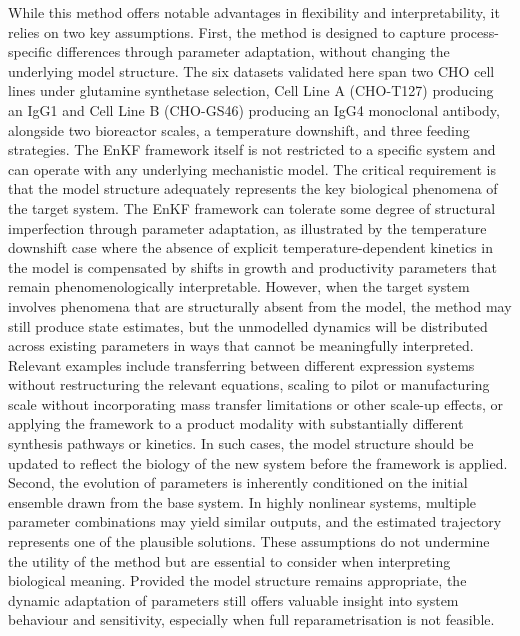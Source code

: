 While this method offers notable advantages in flexibility and interpretability, it relies on two key assumptions. First, the method is designed to capture process-specific differences through parameter adaptation, without changing the underlying model structure. {\color{blue} The six datasets validated here span two CHO cell lines under glutamine synthetase selection, Cell Line A (CHO-T127) producing an IgG1 and Cell Line B (CHO-GS46) producing an IgG4 monoclonal antibody, alongside two bioreactor scales, a temperature downshift, and three feeding strategies. The EnKF framework itself is not restricted to a specific system and can operate with any underlying mechanistic model. The critical requirement is that the model structure adequately represents the key biological phenomena of the target system. The EnKF framework can tolerate some degree of structural imperfection through parameter adaptation, as illustrated by the temperature downshift case where the absence of explicit temperature-dependent kinetics in the model is compensated by shifts in growth and productivity parameters that remain phenomenologically interpretable. However, when the target system involves phenomena that are structurally absent from the model, the method may still produce state estimates, but the unmodelled dynamics will be distributed across existing parameters in ways that cannot be meaningfully interpreted. Relevant examples include transferring between different expression systems without restructuring the relevant equations, scaling to pilot or manufacturing scale without incorporating mass transfer limitations or other scale-up effects, or applying the framework to a product modality with substantially different synthesis pathways or kinetics. In such cases, the model structure should be updated to reflect the biology of the new system before the framework is applied.} Second, the evolution of parameters is inherently conditioned on the initial ensemble drawn from the base system. In highly nonlinear systems, multiple parameter combinations may yield similar outputs, and the estimated trajectory represents one of the plausible solutions. These assumptions do not undermine the utility of the method but are essential to consider when interpreting biological meaning. Provided the model structure remains appropriate, the dynamic adaptation of parameters still offers valuable insight into system behaviour and sensitivity, especially when full reparametrisation is not feasible.

